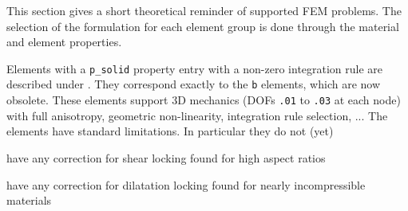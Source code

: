 

This section gives a short theoretical reminder of supported FEM problems. The selection of the formulation for each element group is done through the material and element properties.




Elements with a {\tt p\_solid} property entry with a non-zero integration rule are described under \psolid. They correspond exactly to the {\tt *b} elements, which are now obsolete. These elements support 3D mechanics (DOFs  {\tt .01} to {\tt .03} at each node) with full anisotropy, geometric non-linearity, integration rule selection, ... The elements have standard limitations. In particular they do not (yet)

\begin{Eitem}
\item have any correction for shear locking found for high aspect ratios
\item have any correction for dilatation locking found for nearly incompressible materials
\end{Eitem}


